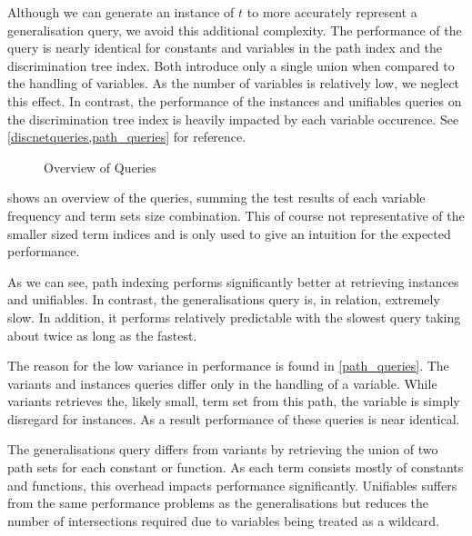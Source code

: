 Although we can generate an instance of $t$ to more accurately represent a generalisation query, we avoid this additional complexity. The performance of the query is nearly identical for constants and variables in the path index and the discrimination tree index. Both introduce only a single union when compared to the handling of variables. As the number of variables is relatively low, we neglect this effect. In contrast, the performance of the instances and unifiables queries on the discrimination tree index is heavily impacted by each variable occurence. See \cref{discnetqueries,path_queries} for reference.

\begin{figure}[h]
  \centering
{}
\caption{Overview of Queries}
\label{queries}
\end{figure}

 shows an overview of the queries, summing the test results of each variable frequency and term sets size combination. This of course not representative of the smaller sized term indices and is only used to give an intuition for the expected performance.

As we can see, path indexing performs significantly better at retrieving instances and unifiables. In contrast, the generalisations query is, in relation, extremely slow. In addition, it performs relatively predictable with the slowest query taking about twice as long as the fastest.

The reason for the low variance in performance is found in \cref{path_queries}. The variants and instances queries differ only in the handling of a variable. While variants retrieves the, likely small, term set from this path, the variable is simply disregard for instances. As a result performance of these queries is near identical.

The generalisations query differs from variants by retrieving the union of two path sets for each constant or function. As each term consists mostly of constants and functions, this overhead impacts performance significantly. Unifiables suffers from the same performance problems as the generalisations but reduces the number of intersections required due to variables being treated as a wildcard.

